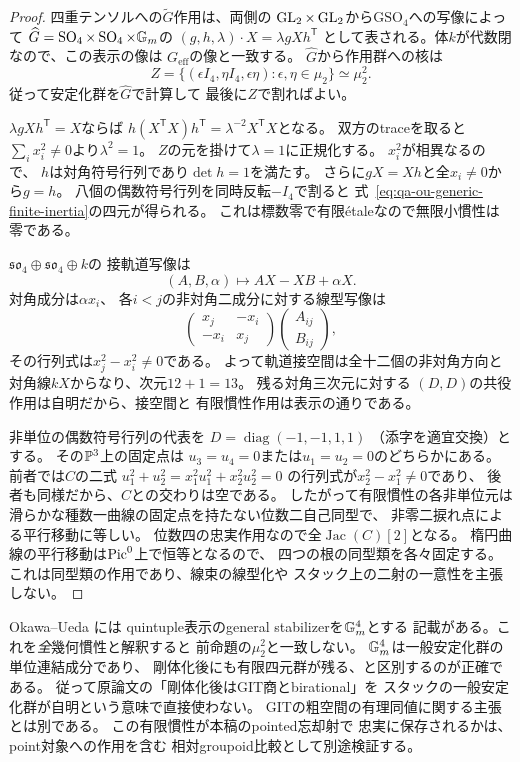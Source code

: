 \begin{proof}
四重テンソルへの$\widetilde G$作用は、両側の
$\operatorname{GL}_2\times\operatorname{GL}_2$から$\mathrm{GSO}_4$への写像によって
$\widehat G=\operatorname{SO}_4\times\operatorname{SO}_4\times\mathbb G_m$の
$(g,h,\lambda)\cdot X=\lambda gXh^{\mathsf T}$
として表される。体$k$が代数閉なので、この表示の像は
$G_{\mathrm{eff}}$の像と一致する。
$\widehat G$から作用群への核は
\[
 Z=\{(\epsilon I_4,\eta I_4,\epsilon\eta):
              \epsilon,\eta\in\mu_2\}
 \simeq\mu_2^2 .
\]
従って安定化群を$\widehat G$で計算して
最後に$Z$で割ればよい。

$\lambda gXh^{\mathsf T}=X$ならば
$h(X^{\mathsf T}X)h^{\mathsf T}
=\lambda^{-2}X^{\mathsf T}X$となる。
双方のtraceを取ると
$\sum_i x_i^2\ne0$より$\lambda^2=1$。
$Z$の元を掛けて$\lambda=1$に正規化する。
$x_i^2$が相異なるので、
$h$は対角符号行列であり$\det h=1$を満たす。
さらに$gX=Xh$と全$x_i\ne0$から$g=h$。
八個の偶数符号行列を同時反転$-I_4$で割ると
式~\eqref{eq:qa-ou-generic-finite-inertia}の四元が得られる。
これは標数零で有限étaleなので無限小慣性は零である。

$\mathfrak{so}_4\oplus\mathfrak{so}_4\oplus k$の
接軌道写像は
\[
 (A,B,\alpha)\longmapsto AX-XB+\alpha X.
\]
対角成分は$\alpha x_i$、
各$i<j$の非対角二成分に対する線型写像は
\[
 \begin{pmatrix}x_j&-x_i\\-x_i&x_j\end{pmatrix}
 \begin{pmatrix}A_{ij}\\B_{ij}\end{pmatrix},
\]
その行列式は$x_j^2-x_i^2\ne0$である。
よって軌道接空間は全十二個の非対角方向と
対角線$kX$からなり、次元$12+1=13$。
残る対角三次元に対する
$(D,D)$の共役作用は自明だから、接空間と
有限慣性作用は表示の通りである。

非単位の偶数符号行列の代表を
$D=\operatorname{diag}(-1,-1,1,1)$
（添字を適宜交換）とする。
その$\mathbb P^3$上の固定点は
$u_3=u_4=0$または$u_1=u_2=0$のどちらかにある。
前者では$C$の二式
$u_1^2+u_2^2=x_1^2u_1^2+x_2^2u_2^2=0$
の行列式が$x_2^2-x_1^2\ne0$であり、
後者も同様だから、$C$との交わりは空である。
したがって有限慣性の各非単位元は
滑らかな種数一曲線の固定点を持たない位数二自己同型で、
非零二捩れ点による平行移動に等しい。
位数四の忠実作用なので全$\operatorname{Jac}(C)[2]$となる。
楕円曲線の平行移動は$\operatorname{Pic}^0$上で恒等となるので、
四つの根の同型類を各々固定する。
これは同型類の作用であり、線束の線型化や
スタック上の二射の一意性を主張しない。
\end{proof}

\begin{remark}
\label{rem:qa-ou-generic-inertia-source-audit}
Okawa--Ueda \cite[Theorem 1.1(1)]{OU2014} には
quintuple表示のgeneral stabilizerを$\mathbb G_m^4$とする
記載がある。これを\emph{全}幾何慣性と解釈すると
前命題の$\mu_2^2$と一致しない。
$\mathbb G_m^4$は一般安定化群の単位連結成分であり、
剛体化後にも有限四元群が残る、と区別するのが正確である。
従って原論文の「剛体化後はGIT商とbirational」を
スタックの一般安定化群が自明という意味で直接使わない。
GITの粗空間の有理同値に関する主張とは別である。
この有限慣性が本稿のpointed忘却射で
忠実に保存されるかは、point対象への作用を含む
相対groupoid比較として別途検証する。
\end{remark}


